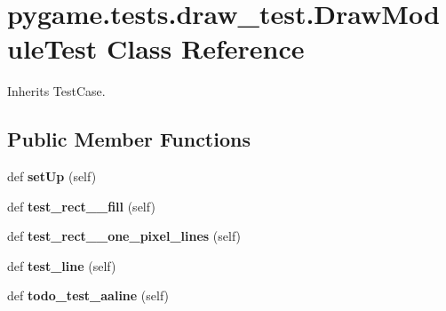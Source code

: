 \hypertarget{classpygame_1_1tests_1_1draw__test_1_1_draw_module_test}{}\section{pygame.\+tests.\+draw\+\_\+test.\+Draw\+Module\+Test Class Reference}
\label{classpygame_1_1tests_1_1draw__test_1_1_draw_module_test}


Inherits Test\+Case.

\subsection*{Public Member Functions}
\begin{DoxyCompactItemize}
\item 
\mbox{\label{classpygame_1_1tests_1_1draw__test_1_1_draw_module_test_af1db62d5c1203ae86abc2e183fbc84d9}} 
def {\bfseries set\+Up} (self)
\item 
\mbox{\label{classpygame_1_1tests_1_1draw__test_1_1_draw_module_test_a708f202b9f5ad997a4745479fe8d37c2}} 
def {\bfseries test\+\_\+rect\+\_\+\+\_\+fill} (self)
\item 
\mbox{\label{classpygame_1_1tests_1_1draw__test_1_1_draw_module_test_aae724039fa61176e1304ef47d064cf6b}} 
def {\bfseries test\+\_\+rect\+\_\+\+\_\+one\+\_\+pixel\+\_\+lines} (self)
\item 
\mbox{\label{classpygame_1_1tests_1_1draw__test_1_1_draw_module_test_afd1355e6c2eb2ad6b767906548835379}} 
def {\bfseries test\+\_\+line} (self)
\item 
\mbox{\label{classpygame_1_1tests_1_1draw__test_1_1_draw_module_test_a64de42337b2decf93c3b71127f4dd643}} 
def {\bfseries todo\+\_\+test\+\_\+aaline} (self)
\item 
\mbox{\label{classpygame_1_1tests_1_1draw__test_1_1_draw_module_test_a80231d15b48917ce37ba4752e0be6ec3}} 

\end{DoxyCompactItemize}
